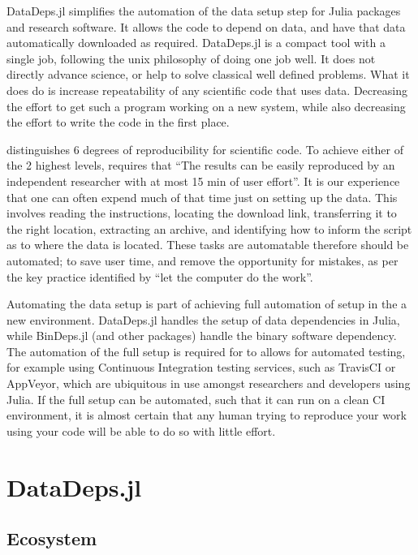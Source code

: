 \documentclass[twoside,11pt]{article}
\begin{document}
DataDeps.jl simplifies the automation of the data setup step for Julia \citep{Julia}  packages and research software.
It allows the code to depend on data, and have that data automatically downloaded as required.
DataDeps.jl is a compact tool with a single job, following the unix philosophy of doing one job well.
It does not directly advance science, or help to solve classical well defined problems.
What it does do is increase repeatability of any scientific code that uses data.
Decreasing the effort to get such a program working on a new system,
while also decreasing the effort to write the code in the first place.


\citet{VabdewakkeReproduceableResearch} distinguishes 6 degrees of reproducibility for scientific code.
To achieve either of the 2 highest levels,
requires that ``The results can be easily reproduced by an independent researcher with at most 15 min of user effort''.
It is our experience that one can often expend much of that time just on setting up the data.
This involves reading the instructions, locating the download link, transferring it to the right location, extracting an archive, and identifying how to inform the script as to where the data is located.
These tasks are automatable therefore should be automated; to save user time, and remove the opportunity for mistakes, as per the key practice identified by \citet{10.1371/journal.pbio.1001745} ``let the computer do the work''.

Automating the data setup is part of achieving full automation of setup in the a new environment.
DataDeps.jl handles the setup of data dependencies in Julia, while BinDeps.jl (and other packages) handle the binary software dependency.
The automation of the full setup is required for to allows for automated testing, for example using Continuous Integration testing services, such as TravisCI or AppVeyor, which are ubiquitous in use amongst researchers and developers using Julia.
If the full setup can be automated, such that it can run on a clean CI environment,
it is almost certain that any human trying to reproduce your work 
using your code will be able to do so with little effort.




\section{DataDeps.jl}
\subsection{Ecosystem}
\end{document}
